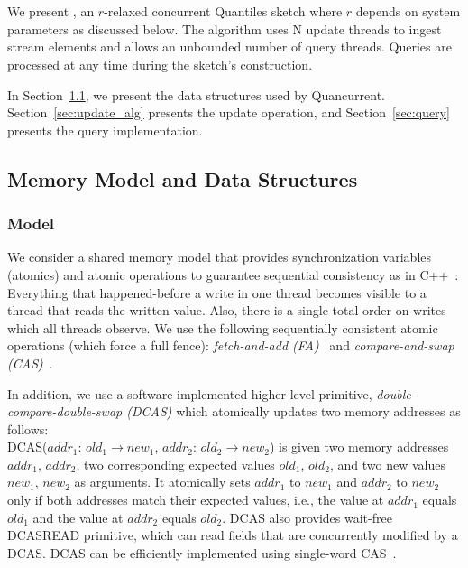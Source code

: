 \chapter{\mysketch}
\label{chap:quancurrent}

We present \mysketch, an $r$-relaxed concurrent Quantiles sketch where $r$ depends on system parameters as discussed below. The algorithm uses \gls{N} update threads to ingest stream elements and allows an unbounded number of query threads. Queries are processed at any time during the sketch's construction. 

In Section~\ref{sec:data_org}, we present the data structures used by Quancurrent. Section~\ref{sec:update_alg} presents the update operation, and Section~\ref{sec:query} presents the query implementation. 

\section{Memory Model and Data Structures} \label{sec:data_org}
\subsection{Model}

We consider a shared memory model that provides synchronization variables (atomics) and atomic operations to guarantee sequential consistency as in C++~\cite{Boehm_2008_cpp}: Everything that happened-before a write in one thread becomes visible to a thread that reads the written value. Also, there is a single total order on writes which all threads observe. 
We use the following sequentially consistent atomic operations (which force a full fence): \emph{fetch-and-add (\acrshort{FA})}~\cite{x86-faa} and \emph{compare-and-swap (\acrshort{CAS})}~\cite{x86-cas}. 

In addition, we use a software-implemented higher-level primitive, \emph{double-compare-double-swap (\acrshort{DCAS})} which atomically updates two memory addresses as follows:\\
DCAS($addr_1$: $old_1 \to new_1$, $addr_2$: $old_2 \to new_2$)
is given two memory addresses $addr_1$, $addr_2$, two corresponding expected values $old_1$, $old_2$, and two new values $new_1$, $new_2$ as arguments. It atomically sets $addr_1$ to $new_1$ and $addr_2$ to $new_2$ only if both addresses match their expected values, i.e., the value at $addr_1$ equals $old_1$ and the value at $addr_2$ equals $old_2$. DCAS also provides wait-free \acrshort{DCASREAD} primitive, which can read fields that are concurrently modified by a DCAS. DCAS can be efficiently implemented using single-word CAS~\cite{Harris2002practical,guerraoui2020efficient}. 

